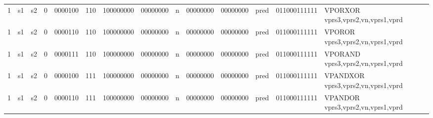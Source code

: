 \begin{landscape}
\begin{table}[p]
\begin{small}
\begin{center}
\begin{tabular}{p{0.08in}@{}p{0.08in}@{}p{0.08in}@{}p{0.08in}@{}p{0.50in}@{}p{0.30in}@{}p{0.08in}@{}p{0.8in}@{}p{0.48in}@{}p{0.32in}@{}p{0.08in}@{}p{0.8in}@{}p{0.8in}@{}p{0.4in}@{}p{0.56in}l}
\multicolumn{1}{|c|}{1} &
\multicolumn{1}{c|}{s1} &
\multicolumn{1}{c|}{s2} &
\multicolumn{1}{c|}{0} &
\multicolumn{1}{c|}{0000100} &
\multicolumn{1}{c|}{110} &
\multicolumn{2}{c|}{100000000} &
\multicolumn{2}{c|}{00000000} &
\multicolumn{1}{c|}{n} &
\multicolumn{1}{c|}{00000000} &
\multicolumn{1}{c|}{00000000} &
\multicolumn{1}{c|}{pred} &
\multicolumn{1}{c|}{011000111111} & VPORXOR vprs3,vprs2,vn,vprs1,vprd \\
\cline{1-15}
  

\multicolumn{1}{|c|}{1} &
\multicolumn{1}{c|}{s1} &
\multicolumn{1}{c|}{s2} &
\multicolumn{1}{c|}{0} &
\multicolumn{1}{c|}{0000110} &
\multicolumn{1}{c|}{110} &
\multicolumn{2}{c|}{100000000} &
\multicolumn{2}{c|}{00000000} &
\multicolumn{1}{c|}{n} &
\multicolumn{1}{c|}{00000000} &
\multicolumn{1}{c|}{00000000} &
\multicolumn{1}{c|}{pred} &
\multicolumn{1}{c|}{011000111111} & VPOROR vprs3,vprs2,vn,vprs1,vprd \\
\cline{1-15}
  

\multicolumn{1}{|c|}{1} &
\multicolumn{1}{c|}{s1} &
\multicolumn{1}{c|}{s2} &
\multicolumn{1}{c|}{0} &
\multicolumn{1}{c|}{0000111} &
\multicolumn{1}{c|}{110} &
\multicolumn{2}{c|}{100000000} &
\multicolumn{2}{c|}{00000000} &
\multicolumn{1}{c|}{n} &
\multicolumn{1}{c|}{00000000} &
\multicolumn{1}{c|}{00000000} &
\multicolumn{1}{c|}{pred} &
\multicolumn{1}{c|}{011000111111} & VPORAND vprs3,vprs2,vn,vprs1,vprd \\
\cline{1-15}
  

\multicolumn{1}{|c|}{1} &
\multicolumn{1}{c|}{s1} &
\multicolumn{1}{c|}{s2} &
\multicolumn{1}{c|}{0} &
\multicolumn{1}{c|}{0000100} &
\multicolumn{1}{c|}{111} &
\multicolumn{2}{c|}{100000000} &
\multicolumn{2}{c|}{00000000} &
\multicolumn{1}{c|}{n} &
\multicolumn{1}{c|}{00000000} &
\multicolumn{1}{c|}{00000000} &
\multicolumn{1}{c|}{pred} &
\multicolumn{1}{c|}{011000111111} & VPANDXOR vprs3,vprs2,vn,vprs1,vprd \\
\cline{1-15}
  

\multicolumn{1}{|c|}{1} &
\multicolumn{1}{c|}{s1} &
\multicolumn{1}{c|}{s2} &
\multicolumn{1}{c|}{0} &
\multicolumn{1}{c|}{0000110} &
\multicolumn{1}{c|}{111} &
\multicolumn{2}{c|}{100000000} &
\multicolumn{2}{c|}{00000000} &
\multicolumn{1}{c|}{n} &
\multicolumn{1}{c|}{00000000} &
\multicolumn{1}{c|}{00000000} &
\multicolumn{1}{c|}{pred} &
\multicolumn{1}{c|}{011000111111} & VPANDOR vprs3,vprs2,vn,vprs1,vprd \\
\cline{1-15}
  


\end{tabular}
\end{center}
\end{small}
\end{table}
\end{landscape}
